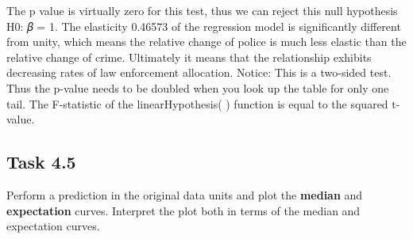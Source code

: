 \documentclass[
]{article}
\begin{document}
The p value is virtually zero for this test, thus we can reject this
null hypothesis H0: 𝛽 = 1. The elasticity 0.46573 of the regression
model is significantly different from unity, which means the relative
change of police is much less elastic than the relative change of crime.
Ultimately it means that the relationship exhibits decreasing rates of
law enforcement allocation. Notice: This is a two-sided test. Thus the
p-value needs to be doubled when you look up the table for only one
tail. The F-statistic of the linearHypothesis( ) function is equal to
the squared t-value.

\hypertarget{task-4.5}{%
\subsection{Task 4.5}\label{task-4.5}}

Perform a prediction in the original data units and plot the
\textbf{median} and \textbf{expectation} curves. Interpret the plot both
in terms of the median and expectation curves.
\end{document}
